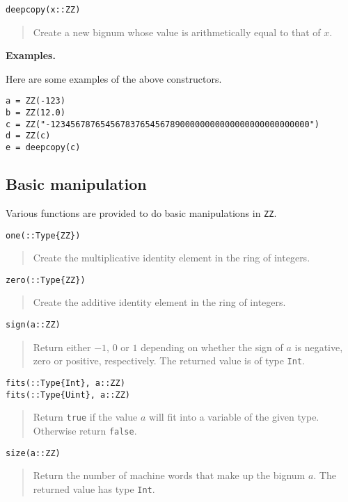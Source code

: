 \documentclass[a4paper,10pt]{article}
\newcommand{\code}{\lstinline}
\newcommand{\desc}[1]{\vspace{-3mm}\begin{quote}#1\end{quote}}
\begin{document}
{{{{\begin{lstlisting}
deepcopy(x::ZZ)
\end{lstlisting}

\desc{Create a new bignum whose value is arithmetically equal to that of $x$.}

\textbf{Examples.}

Here are some examples of the above constructors.

\begin{lstlisting}
a = ZZ(-123)
b = ZZ(12.0)
c = ZZ("-1234567876545678376545678900000000000000000000000000")
d = ZZ(c)
e = deepcopy(c)
\end{lstlisting}

\subsection{Basic manipulation}

Various functions are provided to do basic manipulations in \code{ZZ}.

\begin{lstlisting}
one(::Type{ZZ})
\end{lstlisting}

\desc{Create the multiplicative identity element in the ring of integers.}

\begin{lstlisting}
zero(::Type{ZZ})
\end{lstlisting}

\desc{Create the additive identity element in the ring of integers.}

\begin{lstlisting}
sign(a::ZZ)
\end{lstlisting}

\desc{Return either $-1$, $0$ or $1$ depending on whether the sign of $a$ is negative,
zero or positive, respectively. The returned value is of type \code{Int}.}

\begin{lstlisting}
fits(::Type{Int}, a::ZZ)
fits(::Type{Uint}, a::ZZ)
\end{lstlisting}

\desc{Return \code{true} if the value $a$ will fit into a variable of the given
type. Otherwise return \code{false}.}

\begin{lstlisting}
size(a::ZZ)
\end{lstlisting}

\desc{Return the number of machine words that make up the bignum $a$. The
returned value has type \code{Int}.}

}}}}
\end{document}
